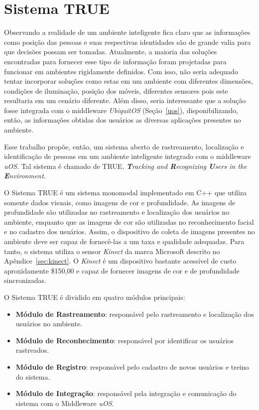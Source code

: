 \chapter{Sistema TRUE}
\label{cap:true}

Observando a realidade de um ambiente inteligente fica claro que as informações como posição das pessoas e suas respectivas identidades são de grande valia para que decisões possam ser tomadas. Atualmente, a maioria das soluções encontradas para fornecer esse tipo de informação foram projetadas para funcionar em ambientes rigidamente definidos. Com isso, não seria adequado tentar incorporar soluções como estas em um ambiente com diferentes dimensões, condições de iluminação, posição dos móveis, diferentes sensores pois este resultaria em um cenário diferente. Além disso, seria interessante que a solução fosse integrada com o middleware \textit{UbiquitOS} (Seção~\ref{uos}), disponibilizando, então, as informações obtidas dos usuários as diversas aplicações presentes no ambiente.


Esse trabalho propõe, então, um sistema aberto de rastreamento, localização e identificação de pessoas em um ambiente inteligente integrado com o middleware \textit{uOS}. Tal sistema é chamado de TRUE, \textit{\textbf{T}racking and \textbf{R}ecognizing \textbf{U}sers in the \textbf{E}nvironment}.

O Sistema TRUE é um sistema monomodal implementado em C++ que utiliza somente dados visuais, como imagens de cor e profundidade. As imagens de profundidade são utilizadas no rastreamento e localização dos usuários no ambiente, enquanto que as imagens de cor são utilizadas no reconhecimento facial e no cadastro dos usuários. Assim, o dispositivo de coleta de imagens presentes no ambiente deve ser capaz de fornecê-las a um taxa e qualidade adequadas. Para tanto, o sistema utiliza o sensor \textit{Kinect} da marca Microsoft descrito no Apêndice~\ref{sec:kinect}. O \textit{Kinect} é um dispositivo bastante acessível de custo aproxidamente \$150,00 e capaz de fornecer imagens de cor e de profundidade sincronizadas.

O Sistema TRUE é dividido em quatro módulos principais:

	\begin{itemize}
		\item \textbf{Módulo de Rastreamento}: responsável pelo rastreamento e localização dos usuários no ambiente.
		\item \textbf{Módulo de Reconhecimento}: responsável por identificar os usuários rastreados.
		\item \textbf{Módulo de Registro}: responsável pelo cadastro de novos usuários e treino do sistema.
		\item \textbf{Módulo de Integração}: responsável pela integração e comunicação do sistema com o Middleware \textit{uOS}.
	\end{itemize}

